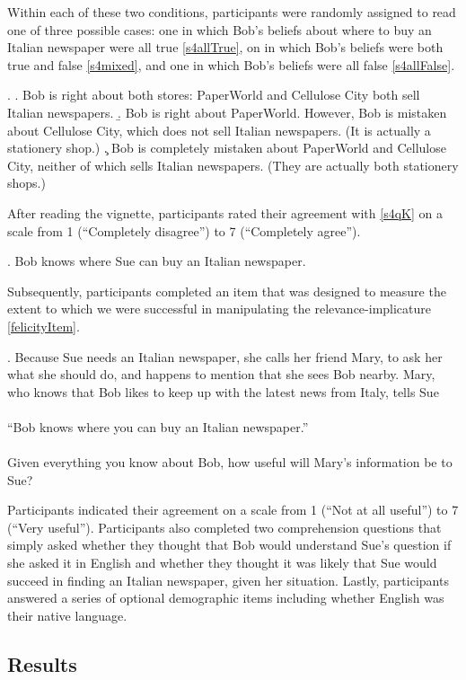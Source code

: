 \documentclass[a4paper]{article}
\begin{document}
Within each of these two conditions, participants were randomly assigned to read one of three possible cases: one in which Bob's beliefs about where to buy an Italian newspaper were all true \ref{s4allTrue}, on in which Bob's beliefs were both true and false \ref{s4mixed}, and one in which Bob's beliefs were all false \ref{s4allFalse}. 

\ex. 
\a. \label{s4allTrue} Bob is right about both stores: PaperWorld and Cellulose City both sell Italian newspapers.
\b. \label{s4mixed} Bob is right about PaperWorld. However, Bob is mistaken about Cellulose City, which does not sell Italian newspapers. (It is actually a stationery shop.)
\c. \label{s4allFalse} Bob is completely mistaken about PaperWorld and Cellulose City, neither of which sells Italian newspapers. (They are actually both stationery shops.)

After reading the vignette, participants rated their agreement with \ref{s4qK} on a scale from 1 (``Completely disagree'') to 7 (``Completely agree''). 

\ex. \label{s4qK} Bob knows where Sue can buy an Italian newspaper.

Subsequently, participants completed an item that was designed to measure the extent to which we were successful in manipulating the relevance-implicature \ref{felicityItem}. 

\ex. \label{felicityItem}Because Sue needs an Italian newspaper, she calls her friend Mary, to ask her what she should do, and happens to mention that she sees Bob nearby. Mary, who knows that Bob likes to keep up with the latest news from Italy, tells Sue \\ \\ ``Bob knows where you can buy an Italian newspaper.'' \\ \\ Given everything you know about Bob, how useful will Mary's information be to Sue?

Participants indicated their agreement on a scale from 1 (``Not at all useful'') to 7 (``Very useful''). Participants also completed two comprehension questions that simply asked whether they thought that Bob would understand Sue's question if she asked it in English and whether they thought it was likely that Sue would succeed in finding an Italian newspaper, given her situation. Lastly, participants answered a series of optional demographic items including whether English was their native language.

\subsection{Results}
\end{document}
